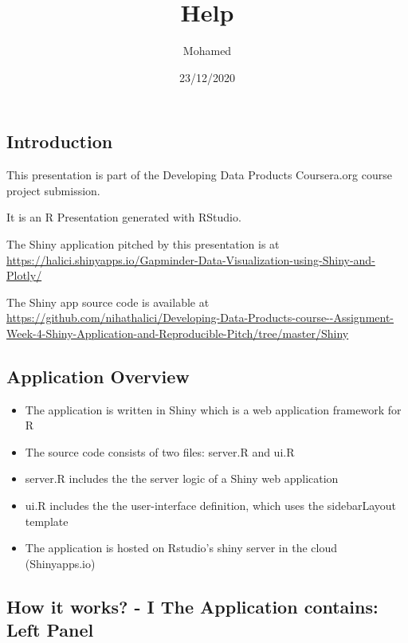 \documentclass[
]{article}
\title{Help}
\author{Mohamed}
\date{23/12/2020}
\providecommand{\tightlist}{%
  \setlength{\itemsep}{0pt}\setlength{\parskip}{0pt}}
\begin{document}
\maketitle

\hypertarget{introduction}{%
\subsection{Introduction}\label{introduction}}

This presentation is part of the Developing Data Products Coursera.org
course project submission.

It is an R Presentation generated with RStudio.

The Shiny application pitched by this presentation is at
\url{https://halici.shinyapps.io/Gapminder-Data-Visualization-using-Shiny-and-Plotly/}

The Shiny app source code is available at
\url{https://github.com/nihathalici/Developing-Data-Products-course--Assignment-Week-4-Shiny-Application-and-Reproducible-Pitch/tree/master/Shiny}

\hypertarget{application-overview}{%
\subsection{Application Overview}\label{application-overview}}

\begin{itemize}
\tightlist
\item
  The application is written in Shiny which is a web application
  framework for R
\item
  The source code consists of two files: server.R and ui.R
\item
  server.R includes the the server logic of a Shiny web application
\item
  ui.R includes the the user-interface definition, which uses the
  sidebarLayout template
\item
  The application is hosted on Rstudio's shiny server in the cloud
  (Shinyapps.io)
\end{itemize}

\hypertarget{how-it-works---i-the-application-contains-left-panel}{%
\subsection{How it works? - I \textbar{} The Application contains: Left
Panel}\label{how-it-works---i-the-application-contains-left-panel}}
\end{document}

